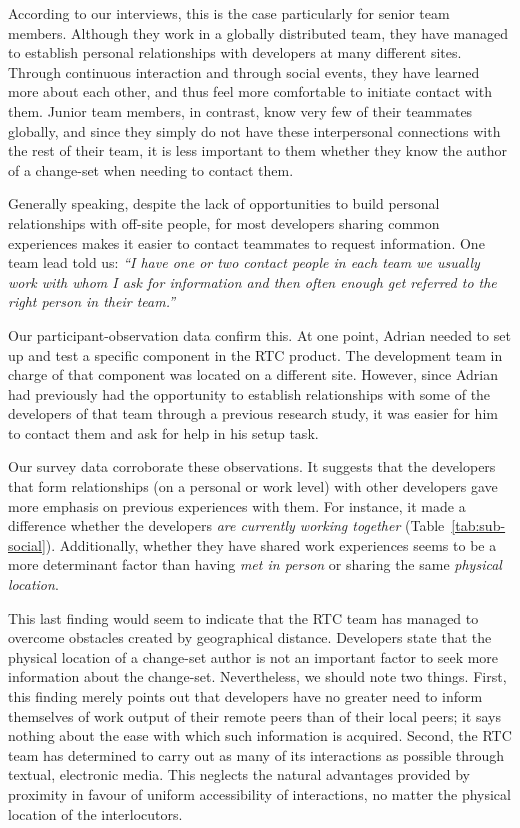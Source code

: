 According to our interviews, this is the case particularly for senior team members. Although they work in a globally distributed team, they have managed to establish personal relationships with developers at many different sites. Through continuous interaction and through social events, they have learned more about each other, and thus feel more comfortable to initiate contact with them. Junior team members, in contrast, know very few of their teammates globally, and since they simply do not have these interpersonal connections with the rest of their team, it is less important to them whether they know the author of a change-set when needing to contact them.

Generally speaking, despite the lack of opportunities to build personal relationships with off-site people, for most developers sharing common experiences makes it easier to contact teammates to request information. One team lead told us: \emph{``I have one or two contact people in each team we usually work with whom I ask for information and then often enough get referred to the right person in their team.''}

Our participant-observation data confirm this. At one point, Adrian needed to set up and test a specific component in the RTC product. The development team in charge of that component was located on a different site. However, since Adrian had previously had the opportunity to establish relationships with some of the developers of that team through a previous research study, it was easier for him to contact them and ask for help in his setup task.

Our survey data corroborate these observations. It suggests that the developers that form relationships (on a personal or work level) with other developers gave more emphasis on previous experiences with them. For instance, it made a difference whether the developers \emph{are currently working together} (Table~\ref{tab:sub-social}). Additionally, whether they have shared work experiences seems to be a more determinant factor than having \emph{met in person} or sharing the same \emph{physical location}.

This last finding would seem to indicate that the RTC team has managed to overcome obstacles created by geographical distance. Developers state that the physical location of a change-set author is not an important factor to seek more information about the change-set. Nevertheless, we should note two things. First, this finding merely points out that developers have no greater need to inform themselves of work output of their remote peers than of their local peers; it says nothing about the ease with which such information is acquired. Second, the RTC team has determined to carry out as many of its interactions as possible through textual, electronic media. This neglects the natural advantages provided by proximity in favour of uniform accessibility of interactions, no matter the physical location of the interlocutors.



